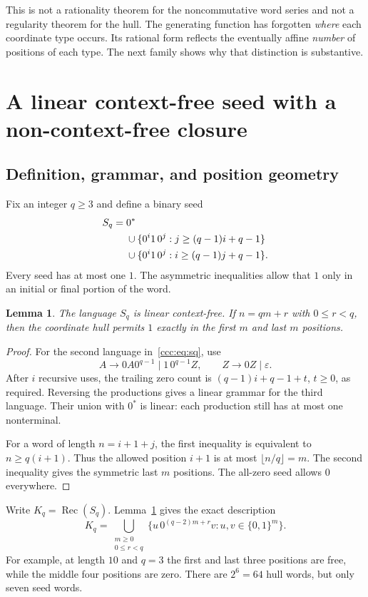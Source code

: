 \documentclass[11pt,letterpaper]{article}
\newtheorem{lemma}[theorem]{Lemma}
\theoremstyle{definition}
\theoremstyle{remark}
\newcommand{\eps}{\varepsilon}
\newcommand{\rec}{\operatorname{Rec}}
\begin{document}
This is not a rationality theorem for the noncommutative word series and not
a regularity theorem for the hull. The generating function has forgotten
\emph{where} each coordinate type occurs. Its rational form reflects the
eventually affine \emph{number} of positions of each type. The next family
shows why that distinction is substantive.

\section{A linear context-free seed with a non-context-free closure}
\label{ccc:sec:family}

\subsection{Definition, grammar, and position geometry}

Fix an integer $q\geq3$ and define a binary seed
\begin{align}
 S_q={}&0^*\notag\\
 &\cup\{0^i1\,0^j:j\geq(q-1)i+q-1\}\notag\\
 &\cup\{0^i1\,0^j:i\geq(q-1)j+q-1\}.
 \label{ccc:eq:sq}
\end{align}
Every seed has at most one $1$. The asymmetric inequalities allow that $1$
only in an initial or final portion of the word.

\begin{lemma}\label{ccc:lem:linear}
The language $S_q$ is linear context-free. If $n=qm+r$ with
$0\leq r<q$, then the coordinate hull permits $1$ exactly in the first $m$
and last $m$ positions.
\end{lemma}
\begin{proof}
For the second language in~\eqref{ccc:eq:sq}, use
\[
 A\to0A0^{q-1}\mid1\,0^{q-1}Z,\qquad Z\to0Z\mid\eps.
\]
After $i$ recursive uses, the trailing zero count is
$(q-1)i+q-1+t$, $t\geq0$, as required. Reversing the productions gives a
linear grammar for the third language. Their union with $0^*$ is linear:
each production still has at most one nonterminal.

For a word of length $n=i+1+j$, the first inequality is equivalent to
$n\geq q(i+1)$. Thus the allowed position $i+1$ is at most
$\lfloor n/q\rfloor=m$. The second inequality gives the symmetric last $m$
positions. The all-zero seed allows $0$ everywhere.
\end{proof}

Write $K_q=\rec(S_q)$. Lemma~\ref{ccc:lem:linear} gives the exact description
\begin{equation}
 K_q=\bigcup_{\substack{m\geq0\\0\leq r<q}}
       \{u\,0^{(q-2)m+r}v:u,v\in\{0,1\}^m\}.
 \label{ccc:eq:kq}
\end{equation}
For example, at length $10$ and $q=3$ the first and last three positions are
free, while the middle four positions are zero. There are $2^6=64$ hull
words, but only seven seed words.
\end{document}
